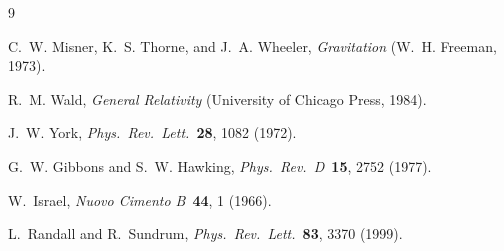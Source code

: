 \documentclass[11pt,a4paper]{article}
\begin{document}
\begin{thebibliography}{9}

C.~W. Misner, K.~S. Thorne, and J.~A. Wheeler,
\textit{Gravitation} (W.~H. Freeman, 1973).

R.~M. Wald,
\textit{General Relativity} (University of Chicago Press, 1984).

J.~W. York,
\textit{Phys.\ Rev.\ Lett.}\ \textbf{28}, 1082 (1972).

G.~W. Gibbons and S.~W. Hawking,
\textit{Phys.\ Rev.\ D}\ \textbf{15}, 2752 (1977).

W.~Israel,
\textit{Nuovo Cimento B}\ \textbf{44}, 1 (1966).

L.~Randall and R.~Sundrum,
\textit{Phys.\ Rev.\ Lett.}\ \textbf{83}, 3370 (1999).

\end{thebibliography}
\end{document}

